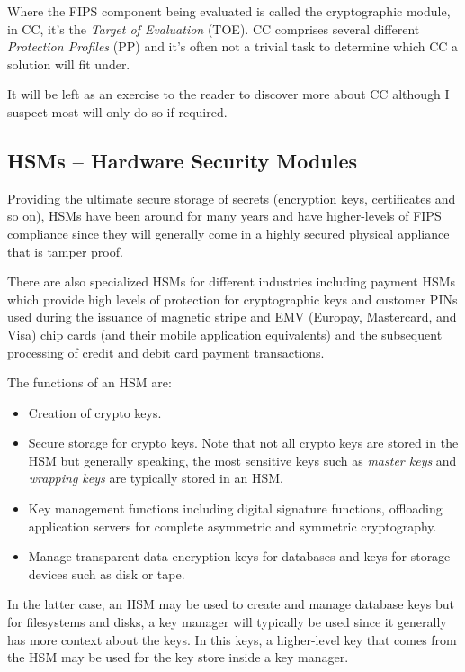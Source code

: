 Where the FIPS component being evaluated is called the cryptographic module, in CC, it's the \textit{Target of Evaluation} (TOE). CC comprises several different \textit{Protection Profiles} (PP) and it's often not a trivial task to determine which CC a solution will fit under.

It will be left as an exercise to the reader to discover more about CC although I suspect most will only do so if required.

\subsection{HSMs -- Hardware Security Modules}

Providing the ultimate secure storage of secrets (encryption keys, certificates and so on), HSMs have been around for many years and have higher-levels of FIPS compliance since they will generally come in a highly secured physical appliance that is tamper proof. 

There are also specialized HSMs for different industries including payment HSMs which provide high levels of protection for cryptographic keys and customer PINs used during the issuance of magnetic stripe and EMV (Europay, Mastercard, and Visa) chip cards (and their mobile application equivalents) and the subsequent processing of credit and debit card payment transactions.

The functions of an HSM are:

\begin{itemize}
	\item Creation of crypto keys.
	\item Secure storage for crypto keys. Note that not all crypto keys are stored in the HSM but generally
		speaking, the most sensitive keys such as \textit{master keys} and \textit{wrapping keys} are
		typically stored in an HSM. 
	\item Key management functions including digital signature functions, offloading application servers 
		for complete asymmetric and symmetric cryptography.
	\item Manage transparent data encryption keys for databases and keys for storage devices such 
		as disk or tape.
\end{itemize}

\noindent
In the latter case, an HSM may be used to create and manage database keys but for filesystems and disks, a
key manager will typically be used since it generally has more context about the keys. In this keys, a higher-level
key that comes from the HSM may be used for the key store inside a key manager. 

